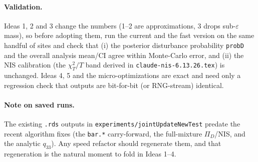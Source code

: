 \documentclass[11pt]{article}
\newcommand{\code}[1]{\texttt{#1}}
\begin{document}
\paragraph{Validation.} Ideas 1, 2 and 3 change the numbers (1--2 are approximations,
3 drops sub-$\varepsilon$ mass), so before adopting them, run the current and the fast
version on the same handful of sites and check that (i) the posterior disturbance
probability \code{probD} and the overall analysis mean/CI agree within Monte-Carlo error,
and (ii) the NIS calibration (the $\chi^2_T/T$ band derived in
\code{claude-nis-6.13.26.tex}) is unchanged. Ideas 4, 5 and the micro-optimizations are
exact and need only a regression check that outputs are bit-for-bit (or RNG-stream)
identical.

\paragraph{Note on saved runs.} The existing \code{.rds} outputs in
\code{experiments/jointUpdateNewTest} predate the recent algorithm fixes (the
\code{bar.*} carry-forward, the full-mixture $\Pi_D$/NIS, and the analytic $q_{33}$).
Any speed refactor should regenerate them, and that regeneration is the natural moment
to fold in Ideas 1--4.
\end{document}
